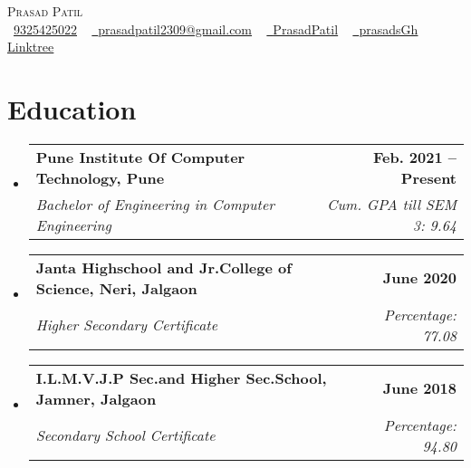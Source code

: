 \documentclass[letterpaper,11pt]{article}
\makeatletter
\newcommand{\resumeSubheading}[4]{
  \vspace{-2pt}\item
    \begin{tabular*}{1.0\textwidth}[t]{l@{\extracolsep{\fill}}r}
      \textbf{#1} & \textbf{\small #2} \\
      \textit{\small#3} & \textit{\small #4} \\
    \end{tabular*}\vspace{-7pt}
}
\newcommand{\resumeSubHeadingListStart}{\begin{itemize}[leftmargin=0.0in, label={}]}
\newcommand{\resumeSubHeadingListEnd}{\end{itemize}}
\makeatother
\begin{document}

\begin{center}
    {\Huge \scshape Prasad Patil} \\ \vspace{10pt}
    \small \raisebox{-0.1\height}\faPhone\ \href{tel:9325425022}{\underline {9325425022}} ~ \href{mailto:prasadpatil2309@gmail.com}{\raisebox{-0.2\height}\faEnvelope\  \underline{prasadpatil2309@gmail.com}} ~ 
    \href{https://www.linkedin.com/in/prasad-patil-992737200/}{\raisebox{-0.2\height}\faLinkedin\ \underline{PrasadPatil}}  ~
    \href{https://github.com/prasadsGh}{\raisebox{-0.2\height}\faGithub\ \underline{prasadsGh}}~
     \href{https://linktr.ee/prasadsLt}{\raisebox{-0.2\height} \faBell  \underline{Linktree}}
    \vspace{2pt}
\end{center}

\section{Education}
  \resumeSubHeadingListStart
    \resumeSubheading
      {Pune Institute Of Computer Technology, Pune}{Feb. 2021 -- Present}
      {Bachelor of Engineering in Computer Engineering}{Cum. GPA till SEM 3: 9.64}
  \resumeSubheading
      {Janta Highschool and Jr.College of Science, Neri, Jalgaon}{June 2020}
      {Higher Secondary Certificate  }{Percentage: 77.08}
  \resumeSubheading
      {I.L.M.V.J.P Sec.and Higher Sec.School, Jamner, Jalgaon}{June 2018}
      {Secondary School Certificate }{Percentage: 94.80}
  \resumeSubHeadingListEnd
 \vspace{-8pt}

\end{document}
